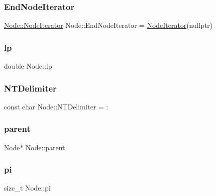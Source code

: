 \subsubsection{\texorpdfstring{End\+Node\+Iterator}{EndNodeIterator}}
{\footnotesize\ttfamily \hyperlink{class_node_1_1_node_iterator}{Node\+::\+Node\+Iterator} Node\+::\+End\+Node\+Iterator = \hyperlink{class_node_1_1_node_iterator}{Node\+Iterator}(nullptr)\hspace{0.3cm}{\ttfamily [static]}}

\mbox{\label{class_node_a298eaa3743b774a3f9ef396e1dc42a08}} 
\subsubsection{\texorpdfstring{lp}{lp}}
{\footnotesize\ttfamily double Node\+::lp}

\mbox{\label{class_node_abd26102ffbe2a3e00c34bed5508b3234}} 
\subsubsection{\texorpdfstring{N\+T\+Delimiter}{NTDelimiter}}
{\footnotesize\ttfamily const char Node\+::\+N\+T\+Delimiter = \textquotesingle{}\+:\textquotesingle{}\hspace{0.3cm}{\ttfamily [static]}}

\mbox{\label{class_node_ad8184598cdea70e4bbdfd76f2b0f9e85}} 
\subsubsection{\texorpdfstring{parent}{parent}}
{\footnotesize\ttfamily \hyperlink{class_node}{Node}$\ast$ Node\+::parent}

\mbox{\label{class_node_ad8e140a5af4e5c312141f2b7af255520}} 
\subsubsection{\texorpdfstring{pi}{pi}}
{\footnotesize\ttfamily size\+\_\+t Node\+::pi}

